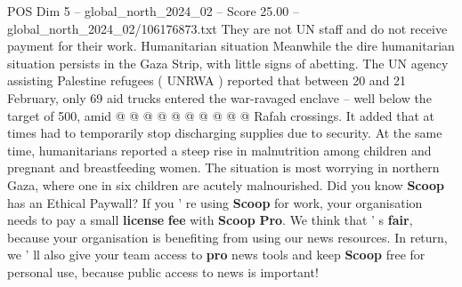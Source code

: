 \begin{textsample}{POS Dim 5 – global\_north\_2024\_02 – Score 25.00 – global\_north\_2024\_02/106176873.txt}
They are not UN staff and do not receive payment for their work.
Humanitarian situation Meanwhile the dire humanitarian situation persists in the Gaza Strip, with little signs of abetting.
The UN agency assisting Palestine refugees ( UNRWA ) reported that between 20 and 21 February, only 69 aid trucks entered the war-ravaged enclave -- well below the target of 500, amid @ @ @ @ @ @ @ @ @ @ Rafah crossings.
It added that at times had to temporarily stop discharging supplies due to security.
At the same time, humanitarians reported a steep rise in malnutrition among children and pregnant and breastfeeding women.
The situation is most worrying in northern Gaza, where one in six children are acutely malnourished.
Did you know \textbf{Scoop} has an Ethical Paywall?
If you ' re using \textbf{Scoop} for work, your organisation needs to pay a small \textbf{license} \textbf{fee} with \textbf{Scoop} \textbf{Pro}.
We think that ' s \textbf{fair}, because your organisation is benefiting from using our news resources.
In return, we ' ll also give your team access to \textbf{pro} news tools and keep \textbf{Scoop} free for personal use, because public access to news is important!

\end{textsample}
